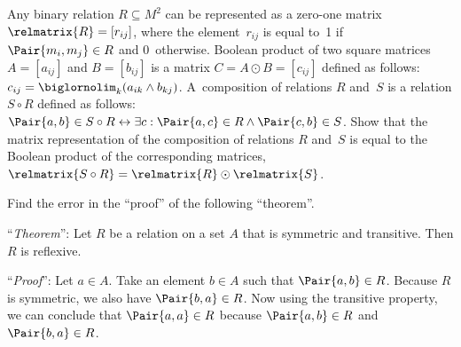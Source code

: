 \documentclass[a4paper,12pt]{article}
\begin{document}
\begin{tasks}




    \item Any binary relation $R \subseteq M^2$ can be represented as a zero-one matrix~$\relmatrix{R} = [r_{ij}]$, where the element~$r_{ij}$ is equal to~1 if $\Pair{m_i, m_j} \in R$ and 0~otherwise.
    Boolean product of two square matrices $A = [a_{ij}]$ and $B = [b_{ij}]$ is a matrix $C = A \odot B = [c_{ij}]$ defined as follows: $c_{ij} = \biglornolim_{k} (a_{ik} \land b_{kj})$.
    A~composition of relations $R$ and~$S$ is a relation $S \circ R$ defined as follows: $\Pair{a,b} \in S \circ R \iff \exists c : \Pair{a,c} \in R \land \Pair{c,b} \in S$.
    Show that the matrix representation of the composition of relations $R$ and~$S$ is equal to the Boolean product of the corresponding matrices, \ie $\relmatrix{S \circ R} = \relmatrix{R} \odot \relmatrix{S}$.


    \item Find the error in the \enquote{proof} of the following \enquote{theorem}.

    \smallskip
    \enquote{\textit{Theorem}}: Let $R$ be a relation on a set $A$ that is symmetric and transitive. Then $R$ is reflexive.

    \smallskip
    \enquote{\textit{Proof}}: Let $a \in A$. Take an element $b \in A$ such that $\Pair{a, b} \in R$. Because $R$ is symmetric, we also have $\Pair{b, a} \in R$. Now using the transitive property, we can conclude that $\Pair{a, a} \in R$ because $\Pair{a, b} \in R$ and $\Pair{b, a} \in R$.



\end{tasks}
\end{document}
